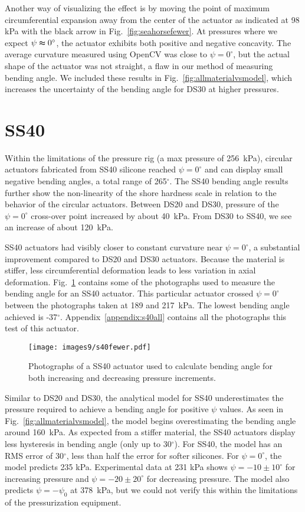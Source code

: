 Another way of visualizing the effect is by moving the point of maximum circumferential expansion away from the center of the actuator as indicated at 98 kPa with the black arrow in Fig.~\ref{fig:seahorsefewer}. At pressures where we expect $\psi\thickapprox0^\circ$, the actuator exhibits both positive and negative concavity. The average curvature measured using OpenCV was close to $\psi=0^\circ$, but the actual shape of the actuator was not straight, a flaw in our method of measuring bending angle. We included these results in Fig.~\ref{fig:allmaterialvsmodel}, which increases the uncertainty of the bending angle for DS30 at higher pressures. 

\clearpage
\section{SS40}

Within the limitations of the pressure rig (a max pressure of 256~kPa), circular actuators fabricated from SS40 silicone reached $\psi=0^\circ$ and can display small negative bending angles, a total range of 265$^\circ$. 
The SS40 bending angle results further show the non-linearity of the shore hardness scale in relation to the behavior of the circular actuators. Between DS20 and DS30, pressure of the $\psi=0^\circ$ cross-over point increased by about 40~kPa. From DS30 to SS40, we see an increase of about 120~kPa. 

SS40 actuators had visibly closer to constant curvature near $\psi=0^\circ$, a substantial improvement compared to DS20 and DS30 actuators. Because the material is stiffer, less circumferential deformation leads to less variation in axial deformation. Fig.~\ref{fig:ss40fewer} contains some of the photographs used to measure the bending angle for an SS40 actuator. This particular actuator crossed $\psi=0^\circ$ between the photographs taken at 189 and 217~kPa. The lowest bending angle achieved is -37$^\circ$. Appendix~\ref{appendix:s40all} contains all the photographs this test of this actuator. 

\begin{figure}[!ht]
    \centering
     \texttt{[image: images9/s40fewer.pdf]}
    \caption{Photographs of a SS40 actuator used to calculate bending angle for both increasing and decreasing pressure increments.}
    \label{fig:ss40fewer}
\end{figure}

\clearpage
Similar to DS20 and DS30, the analytical model for SS40 underestimates the pressure required to achieve a bending angle for positive $\psi$ values. As seen in Fig.~\ref{fig:allmaterialvsmodel}, the model begins overestimating the bending angle around 160~kPa. As expected from a stiffer material, the SS40 actuators display less hysteresis in bending angle (only up to 30$^\circ$). For SS40, the model has an RMS error of 30$^\circ$, less than half the error for softer silicones. For $\psi=0^\circ$, the model predicts 235 kPa. Experimental data at 231 kPa shows $\psi=-10\pm10^\circ$ for increasing pressure and $\psi=-20\pm20^\circ$ for decreasing pressure. The model also predicts $\psi=-\psi_0$ at 378~kPa, but we could not verify this within the limitations of the pressurization equipment. 

